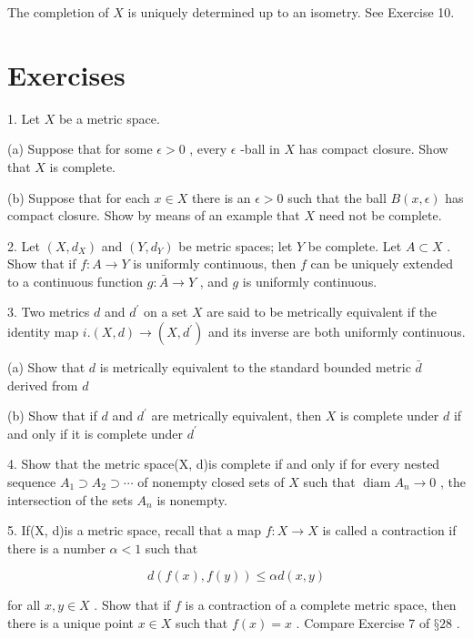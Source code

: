 The completion of \(X\) is uniquely determined up to an isometry. See Exercise 10.

\section*{Exercises}

1. Let \(X\) be a metric space.

(a) Suppose that for some \(\epsilon  > 0\) , every \(\epsilon\) -ball in \(X\) has compact closure. Show that \(X\) is complete.

(b) Suppose that for each \(x \in  X\) there is an \(\epsilon  > 0\) such that the ball \(B\left( {x,\epsilon }\right)\) has compact closure. Show by means of an example that \(X\) need not be complete.

2. Let \(\left( {X,{d}_{X}}\right)\) and \(\left( {Y,{d}_{Y}}\right)\) be metric spaces; let \(Y\) be complete. Let \(A \subset  X\) . Show that if \(f : A \rightarrow  Y\) is uniformly continuous, then \(f\) can be uniquely extended to a continuous function \(g : \bar{A} \rightarrow  Y\) , and \(g\) is uniformly continuous.

3. Two metrics \(d\) and \({d}^{\prime }\) on a set \(X\) are said to be metrically equivalent if the identity map \(i.\left( {X,d}\right)  \rightarrow  \left( {X,{d}^{\prime }}\right)\) and its inverse are both uniformly continuous.

(a) Show that \(d\) is metrically equivalent to the standard bounded metric \(\bar{d}\) derived from \(d\)

(b) Show that if \(d\) and \({d}^{\prime }\) are metrically equivalent, then \(X\) is complete under \(d\) if and only if it is complete under \({d}^{\prime }\)

4. Show that the metric space(X, d)is complete if and only if for every nested sequence \({A}_{1} \supset  {A}_{2} \supset  \cdots\) of nonempty closed sets of \(X\) such that \(\operatorname{diam}{A}_{n} \rightarrow  0\) , the intersection of the sets \({A}_{n}\) is nonempty.

5. If(X, d)is a metric space, recall that a map \(f : X \rightarrow  X\) is called a contraction if there is a number \(\alpha  < 1\) such that

\[
d\left( {f\left( x\right) ,f\left( y\right) }\right)  \leq  {\alpha d}\left( {x,y}\right)
\]

for all \(x,y \in  X\) . Show that if \(f\) is a contraction of a complete metric space, then there is a unique point \(x \in  X\) such that \(f\left( x\right)  = x\) . Compare Exercise 7 of \(§{28}\) .

